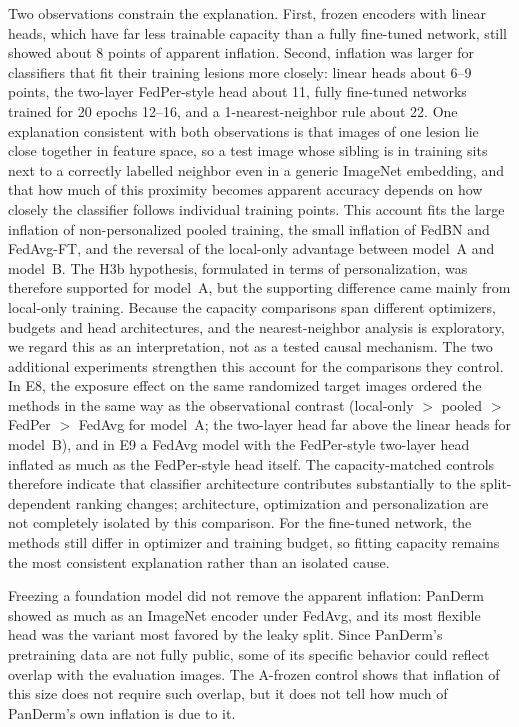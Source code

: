 Two observations constrain the explanation. First, frozen encoders with linear heads, which have far less
trainable capacity than a fully fine-tuned network, still showed about 8 points of apparent inflation.
Second, inflation was larger for classifiers that fit their training lesions more closely: linear heads
about 6--9 points, the two-layer FedPer-style head about 11, fully fine-tuned networks trained for 20 epochs
12--16, and a 1-nearest-neighbor rule about 22. One explanation consistent with both observations is that
images of one lesion lie close together in feature space, so a test image whose sibling is in training sits
next to a correctly labelled neighbor even in a generic ImageNet embedding, and that how much of this
proximity becomes apparent accuracy depends on how closely the classifier follows individual training
points. This account fits the large inflation of non-personalized pooled training, the small inflation of
FedBN and FedAvg-FT, and the reversal of the local-only advantage between model~A and model~B. The H3b
hypothesis, formulated in terms of personalization, was therefore supported for model~A, but the
supporting difference came mainly from local-only training. Because the capacity comparisons span
different optimizers, budgets and head architectures, and the nearest-neighbor analysis is exploratory,
we regard this as an interpretation, not as a tested causal mechanism. The two additional experiments strengthen this account for the
comparisons they control. In E8, the exposure effect on the same randomized target images ordered the
methods in the same way as the observational contrast (local-only $>$ pooled $>$ FedPer $>$ FedAvg for
model~A; the two-layer head far above the linear heads for model~B), and in E9 a FedAvg model with the
FedPer-style two-layer head inflated as much as the FedPer-style head itself. The capacity-matched controls therefore indicate that classifier architecture contributes substantially to the split-dependent ranking changes; architecture, optimization and personalization are not completely isolated by this comparison. For the fine-tuned
network, the methods still differ in optimizer and training budget, so fitting capacity remains the most
consistent explanation rather than an isolated cause.

Freezing a foundation model did not remove the apparent inflation: PanDerm showed as much as an ImageNet
encoder under FedAvg, and its most flexible head was the variant most favored by the leaky split. Since
PanDerm's pretraining data are not fully public, some of its specific behavior could reflect overlap with
the evaluation images. The A-frozen control shows that inflation of this size does not require such
overlap, but it does not tell how much of PanDerm's own inflation is due to it.

